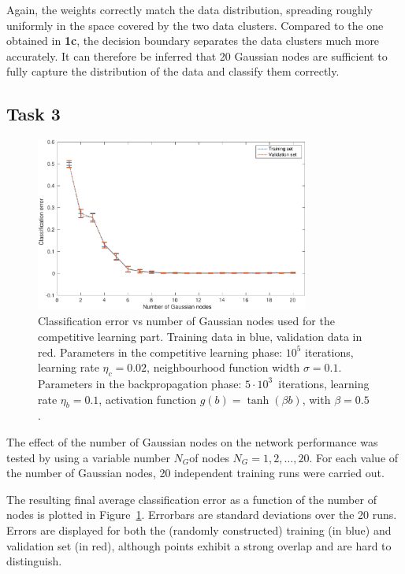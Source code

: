 \documentclass[12pt,titlepage]{article}
\begin{document}
Again, the weights correctly match the data distribution, spreading roughly uniformly in the space covered by the two data clusters. Compared to the one obtained in \textbf{1c}, the decision boundary separates the data clusters much more accurately. It can therefore be inferred that 20 Gaussian nodes are sufficient to fully capture the distribution of the data and classify them correctly.


\clearpage
\subsection*{Task 3}

\begin{figure}[htbp]
\centering
\includegraphics[width=0.8\textwidth]{3_errorVsNodes.pdf}
\caption{Classification error vs number of Gaussian nodes used for the competitive learning part. Training data in blue, validation data in red. Parameters in the competitive learning phase: $10^5$ iterations, learning rate $\eta_c = 0.02$, neighbourhood function width $\sigma = 0.1$. Parameters in the backpropagation phase: $5\cdot10^3$~iterations, learning rate $\eta_b = 0.1$, activation function $g(b) = \tanh(\beta b)$, with $\beta = 0.5$.}
\label{3_errorVsNodes}
\end{figure}

The effect of the number of Gaussian nodes on the network performance was tested by using a variable number $N_G $of nodes $N_G = 1, 2,\ldots,20$. For each value of the number of Gaussian nodes, 20 independent training runs were carried out. 

The resulting final average classification error as a function of the number of nodes is plotted in Figure~\ref{3_errorVsNodes}. Errorbars are standard deviations over the 20 runs. Errors are displayed for both the (randomly constructed) training (in blue) and validation set (in red), although points exhibit a strong overlap and are hard to distinguish.
\end{document}
